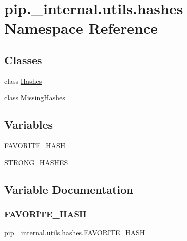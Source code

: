 \hypertarget{namespacepip_1_1__internal_1_1utils_1_1hashes}{}\section{pip.\+\_\+internal.\+utils.\+hashes Namespace Reference}
\label{namespacepip_1_1__internal_1_1utils_1_1hashes}
\subsection*{Classes}
\begin{DoxyCompactItemize}
\item 
class \hyperlink{classpip_1_1__internal_1_1utils_1_1hashes_1_1Hashes}{Hashes}
\item 
class \hyperlink{classpip_1_1__internal_1_1utils_1_1hashes_1_1MissingHashes}{Missing\+Hashes}
\end{DoxyCompactItemize}
\subsection*{Variables}
\begin{DoxyCompactItemize}
\item 
\hyperlink{namespacepip_1_1__internal_1_1utils_1_1hashes_a7abca224a98c362e9db30dcc948ce7ed}{F\+A\+V\+O\+R\+I\+T\+E\+\_\+\+H\+A\+SH}
\item 
\hyperlink{namespacepip_1_1__internal_1_1utils_1_1hashes_a0912ce9e9e7cc781a57464cffc79a0fc}{S\+T\+R\+O\+N\+G\+\_\+\+H\+A\+S\+H\+ES}
\end{DoxyCompactItemize}


\subsection{Variable Documentation}
\mbox{\label{namespacepip_1_1__internal_1_1utils_1_1hashes_a7abca224a98c362e9db30dcc948ce7ed}} 
\subsubsection{\texorpdfstring{F\+A\+V\+O\+R\+I\+T\+E\+\_\+\+H\+A\+SH}{FAVORITE\_HASH}}
{\footnotesize\ttfamily pip.\+\_\+internal.\+utils.\+hashes.\+F\+A\+V\+O\+R\+I\+T\+E\+\_\+\+H\+A\+SH}

